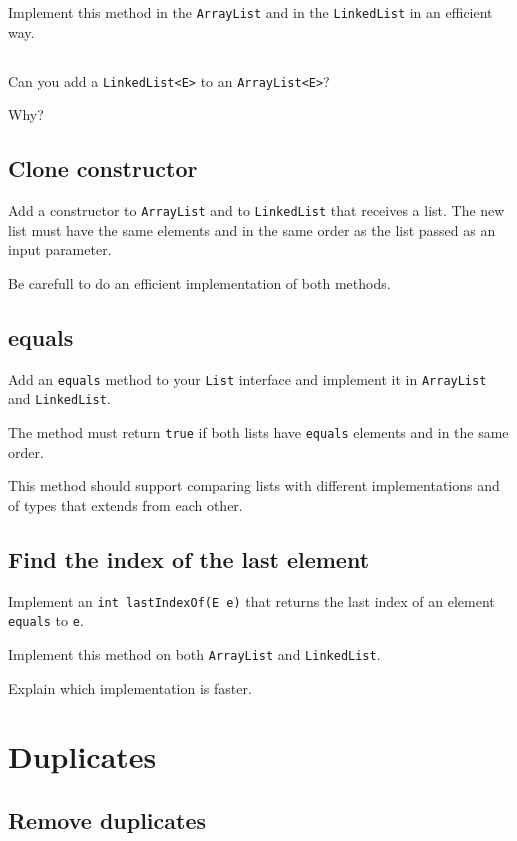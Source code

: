 \documentclass[a4paper, 11pt]{article}
\begin{document}
Implement this method in the \verb+ArrayList+ and in the \verb+LinkedList+ in an efficient way.


\subsection{}

Can you add a \verb+LinkedList<E>+ to an \verb+ArrayList<E>+?

Why?

\subsection{Clone constructor}

Add a constructor to \verb+ArrayList+ and to \verb+LinkedList+ that receives a
list. The new list must have the same elements and in the same order as the
list passed as an input parameter.

Be carefull to do an efficient implementation of both methods.

\subsection{equals}

Add an \verb+equals+ method to your \verb+List+ interface and implement it in \verb+ArrayList+ and \verb+LinkedList+.

The method must return \verb+true+ if both lists have \verb+equals+ elements and in the same order.

This method should support comparing lists with different implementations and of types that extends from each other.


\subsection{Find the index of the last element}

Implement an \verb+int lastIndexOf(E e)+ that returns the last index of an element \verb+equals+ to \verb+e+.

Implement this method on both \verb+ArrayList+ and \verb+LinkedList+.

Explain which implementation is faster.


\section{Duplicates}

\subsection{Remove duplicates}
\end{document}
